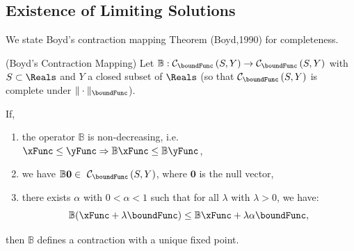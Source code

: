 \documentclass[\econtexRoot/BufferStockTheory]{subfiles}
\begin{document}
\hypertarget{It-Is-A-Contraction-Mapping}{}
\subsection{Existence of Limiting Solutions}\label{sec:Tcontractionmapping}



We state Boyd's contraction mapping Theorem (Boyd,1990) for completeness.

\begin{theorem}(Boyd's Contraction Mapping)\label{thm:Boyd}
Let $\mathbb{B}:\mathcal{C}_{\boundFunc }\left( S,Y\right)
  \rightarrow \mathcal{C}_{\boundFunc }\left(S,Y\right) $ with $S\subset \Reals$ and $Y$ a closed subset of $\Reals$ (so that $\mathcal{C}_{\boundFunc }\left(S,Y\right)$ is complete under $\Vert\cdot\Vert_{\boundFunc}$).

If, 
\begin{enumerate}
  \item the operator $\mathbb{B}$ is non-decreasing, i.e.\ $\xFunc \leq \yFunc \Rightarrow\mathbb{B}{\xFunc } \leq \mathbb{B}{\yFunc}$,
  \item we have $\mathbb{B}\mathbf{0}\in ~ \mathcal{C}_{\boundFunc }\left(S,Y\right) $, where $\mathbf{0}$ is the null vector,
  \item there exists $\alpha$ with $0 < \alpha < 1$ such that for all $\lambda$ with $\lambda > 0$, we have:
             $$\mathbb{B}({\xFunc } +\lambda\boundFunc ) \leq \mathbb{B}{\xFunc } +\lambda\alpha \boundFunc,$$
\end{enumerate}
then $\mathbb{B}$ defines a contraction with a unique fixed point.
\end{theorem}
\end{document}
